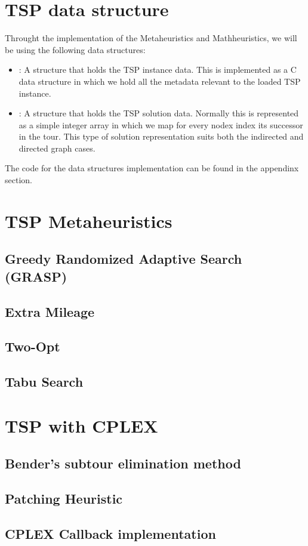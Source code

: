\documentclass{article}
\begin{document}
\section{TSP data structure}
Throught the implementation of the Metaheuristics and Mathheuristics, we will be using the following data structures:
\begin{itemize}
    \item {} : A structure that holds the TSP instance data. This is implemented as a C data structure 
    in which we hold all the metadata relevant to the loaded TSP instance.
    \item {} : A structure that holds the TSP solution data. Normally this is represented as a simple integer array in which we map for every nodex 
    index its successor in the tour. This type of solution representation suits both the indirected and directed graph cases.
\end{itemize}
The code for the data structures implementation can be found in the appendinx section.
\section{TSP Metaheuristics}

\subsection{Greedy Randomized Adaptive Search (GRASP)}

\subsection{Extra Mileage}

\subsection{Two-Opt}

\subsection{Tabu Search}


\section{TSP with CPLEX}

\subsection{Bender's subtour elimination method}

\subsection{Patching Heuristic}

\subsection{CPLEX Callback implementation}


\newpage



\end{document}
